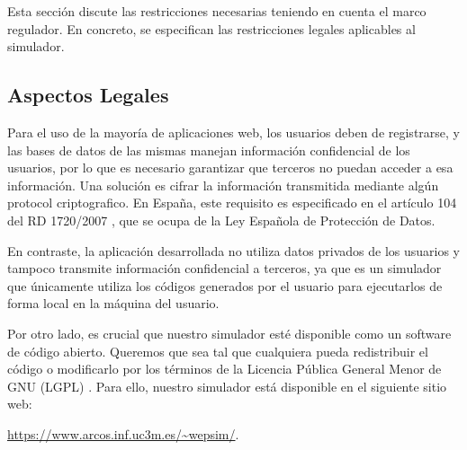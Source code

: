 Esta sección discute las restricciones necesarias teniendo en cuenta el marco regulador. En concreto, se especifican las restricciones legales aplicables al simulador.

\subsection{Aspectos Legales}
\label{sec:legal_constraints}

Para el uso de la mayoría de aplicaciones web, los usuarios deben de registrarse, y las bases de datos de las mismas manejan información confidencial de los usuarios, por lo que es necesario garantizar que terceros no puedan acceder a esa información. Una solución es cifrar la información transmitida mediante algún \gls{protocol} criptografico. En España, este requisito es especificado en el artículo 104 del RD 1720/2007 \cite{boe2008}, que se ocupa de la Ley Española de Protección de Datos.


En contraste, la aplicación desarrollada no utiliza datos privados de los usuarios y tampoco transmite información confidencial a terceros, ya que es un simulador que únicamente utiliza los códigos generados por el usuario para ejecutarlos de forma local en la máquina del usuario.


Por otro lado, es crucial que nuestro simulador esté disponible como un software de código abierto. Queremos que sea tal que cualquiera pueda redistribuir el código o modificarlo por los términos de la Licencia Pública General Menor de GNU (LGPL) \cite{gnulgpl}. Para ello, nuestro simulador está disponible en el siguiente sitio web: 

\url{https://www.arcos.inf.uc3m.es/~wepsim/}.

